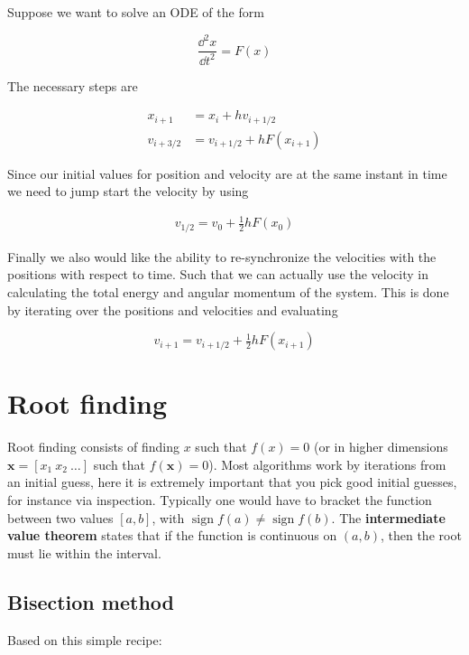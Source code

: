 \documentclass[a4paper]{article}
\DeclareMathOperator{\sign}{sign}
\begin{document}
Suppose we want to solve an ODE of the form

\begin{equation*}
    \frac{\dd^2{x}}{\dd{t}^2}=F(x)
\end{equation*}

The necessary steps are

\begin{align*}
    x_{i+1}&=x_i+hv_{i+1/2}\\[1em]
    v_{i+3/2}&=v_{i+1/2}+hF(x_{i+1})
\end{align*}

Since our initial values for position and velocity are at the same instant in time we need to jump start the velocity by using

\begin{align*}
    v_{1/2}=v_0+\tfrac{1}{2}hF(x_0)
\end{align*}

Finally we also would like the ability to re-synchronize the velocities with the positions with respect to time. Such that we can actually use the velocity in calculating the total energy and angular momentum of the system. This is done by iterating over the positions and velocities and evaluating

\begin{equation*}
    v_{i+1}=v_{i+1/2}+\tfrac{1}{2}hF(x_{i+1})
\end{equation*}

\section{Root finding}

Root finding consists of finding $x$ such that $f(x)=0$ (or in higher dimensions $\mathbf{x}=[x_1\ x_2\ \dots]$ such that $f(\mathbf{x})=0$). Most algorithms work by iterations from an initial guess, here it is extremely important that you pick good initial guesses, for instance via inspection. Typically one would have to bracket the function between two values $[a, b]$, with $\sign{f(a)}\not=\sign{f(b)}$. The \textbf{intermediate value theorem} states that if the function is continuous on $(a, b)$, then the root must lie within the interval.

\subsection{Bisection method}

Based on this simple recipe:
\end{document}
